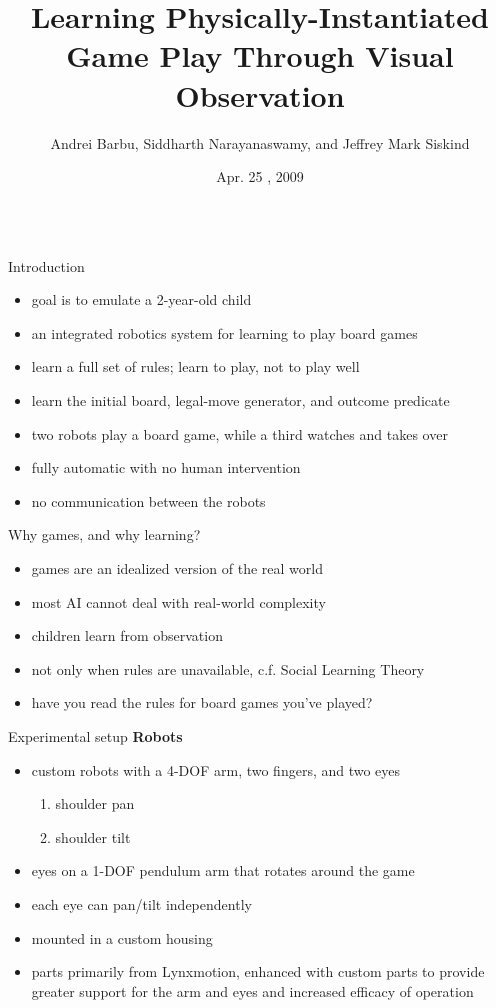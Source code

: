 \documentclass[final,t]{beamer}
\title{\Huge Learning Physically-Instantiated Game Play Through Visual Observation}
\author{Andrei Barbu, Siddharth Narayanaswamy, and Jeffrey Mark Siskind}
\institute[School of ECE]{School of Electrical and Computer Engineering}
\date[Apr. 25 , 2009]{Apr. 25 , 2009}
\begin{document}
\begin{frame}[fragile]{}
  \begin{columns}[t]
    \begin{column}{.3\linewidth}
    \begin{block}{Introduction}
	\begin{itemize}
	\item goal is to emulate a 2-year-old child
	\item an integrated robotics system for learning to play board games
	\item learn a full set of \alert{rules}; learn to play, not to
	  play well
	\item learn the initial board, legal-move generator, and
	  outcome predicate
	\item two robots play a board game, while a third watches and takes
	  over
	\item fully automatic with no human intervention
	\item no communication between the robots
	\end{itemize}
      \end{block}

      \begin{block}{Why games, and why learning?}
	\begin{itemize}
	\item games are an idealized version of the real world
	\item most AI cannot deal with real-world complexity
	\item children learn from observation
	\item not only when rules are unavailable, c.f. Social Learning
	  Theory
	\item have you read the rules for board games you've played?
	\end{itemize}
    \end{block}

    \begin{block}{Experimental setup}
	\textbf{Robots}
	\begin{itemize}
	\item custom robots with a 4-DOF arm, two fingers, and two eyes
	\begin{enumerate}
		\item shoulder pan
		\item shoulder tilt
	\end{enumerate}
	\item eyes on a 1-DOF pendulum arm that rotates around the game
	\item each eye can pan/tilt independently
	\item mounted in a custom housing
	\item parts primarily from Lynxmotion, enhanced with custom parts
	  to provide greater support for the arm and eyes and increased
	  efficacy of operation
	\end{itemize}


\end{block}
\end{column}
\end{columns}
\end{frame}
\end{document}
